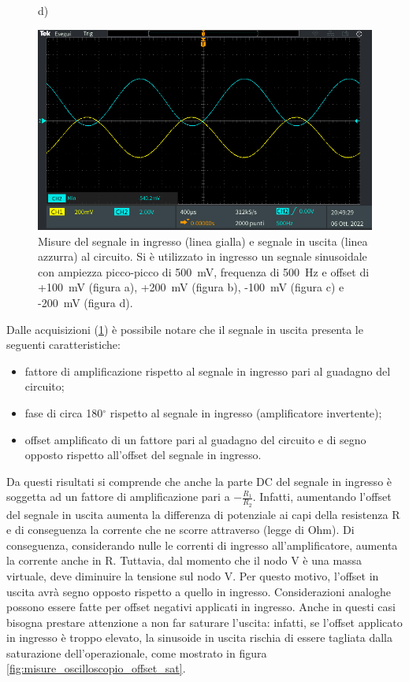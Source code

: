 \begin{figure}[h!]
	\centering
	d)
	
	\includegraphics[width=0.8\linewidth]{./ImageFiles/Laboratorio 1/TEK00015}
	\caption{Misure del segnale in ingresso (linea gialla) e segnale in uscita (linea azzurra) al circuito. Si è utilizzato in ingresso un segnale sinusoidale con ampiezza picco-picco di \SI{500}{\milli\volt}, frequenza di \SI{500}{\hertz} e offset di +\SI{100}{\milli\volt} (figura a), +\SI{200}{\milli\volt} (figura b), -\SI{100}{\milli\volt} (figura c) e -\SI{200}{\milli\volt} (figura d).}
	\label{fig:misure_oscilloscopio_offset}
\end{figure} 

\newpage
\noindent
Dalle acquisizioni (\Fig\ref{fig:misure_oscilloscopio_offset}) è possibile notare che il segnale in uscita presenta le seguenti caratteristiche:
\begin{itemize}
	\item fattore di amplificazione rispetto al segnale in ingresso pari al guadagno del circuito;
	\item fase di circa 180$^\circ$ rispetto al segnale in ingresso (amplificatore invertente);
	\item offset amplificato di un fattore pari al guadagno del circuito e di segno opposto rispetto all'offset del segnale in ingresso.
\end{itemize}
Da questi risultati si comprende che anche la parte DC del segnale in ingresso è soggetta ad un fattore di amplificazione pari a $-\frac{R_1}{R_2}$. Infatti, aumentando l'offset del segnale in uscita aumenta la differenza di potenziale ai capi della resistenza R e di conseguenza la corrente che ne scorre attraverso (legge di Ohm). Di conseguenza, considerando nulle le correnti di ingresso all'amplificatore, aumenta la corrente anche in R. Tuttavia, dal momento che il nodo V\super{-} è una massa virtuale, deve diminuire la tensione sul nodo V. Per questo motivo, l'offset in uscita avrà segno opposto rispetto a quello in ingresso. Considerazioni analoghe possono essere fatte per offset negativi applicati in ingresso.
Anche in questi casi bisogna prestare attenzione a non far saturare l'uscita: infatti, se l'offset applicato in ingresso è troppo elevato, la sinusoide in uscita rischia di essere tagliata dalla saturazione dell'operazionale, come mostrato in figura \ref{fig:misure_oscilloscopio_offset_sat}.

